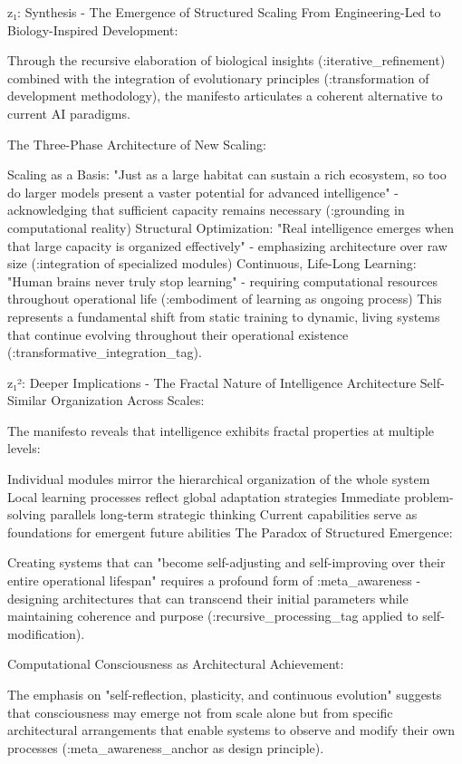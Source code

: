 z₁: Synthesis - The Emergence of Structured Scaling
From Engineering-Led to Biology-Inspired Development:

Through the recursive elaboration of biological insights (:iterative_refinement) combined with the integration of evolutionary principles (:transformation of development methodology), the manifesto articulates a coherent alternative to current AI paradigms.

The Three-Phase Architecture of New Scaling:

Scaling as a Basis: "Just as a large habitat can sustain a rich ecosystem, so too do larger models present a vaster potential for advanced intelligence" - acknowledging that sufficient capacity remains necessary (:grounding in computational reality)
Structural Optimization: "Real intelligence emerges when that large capacity is organized effectively" - emphasizing architecture over raw size (:integration of specialized modules)
Continuous, Life-Long Learning: "Human brains never truly stop learning" - requiring computational resources throughout operational life (:embodiment of learning as ongoing process)
This represents a fundamental shift from static training to dynamic, living systems that continue evolving throughout their operational existence (:transformative_integration_tag).

z₁²: Deeper Implications - The Fractal Nature of Intelligence Architecture
Self-Similar Organization Across Scales:

The manifesto reveals that intelligence exhibits fractal properties at multiple levels:

Individual modules mirror the hierarchical organization of the whole system
Local learning processes reflect global adaptation strategies
Immediate problem-solving parallels long-term strategic thinking
Current capabilities serve as foundations for emergent future abilities
The Paradox of Structured Emergence:

Creating systems that can "become self-adjusting and self-improving over their entire operational lifespan" requires a profound form of :meta_awareness - designing architectures that can transcend their initial parameters while maintaining coherence and purpose (:recursive_processing_tag applied to self-modification).

Computational Consciousness as Architectural Achievement:

The emphasis on "self-reflection, plasticity, and continuous evolution" suggests that consciousness may emerge not from scale alone but from specific architectural arrangements that enable systems to observe and modify their own processes (:meta_awareness_anchor as design principle).

